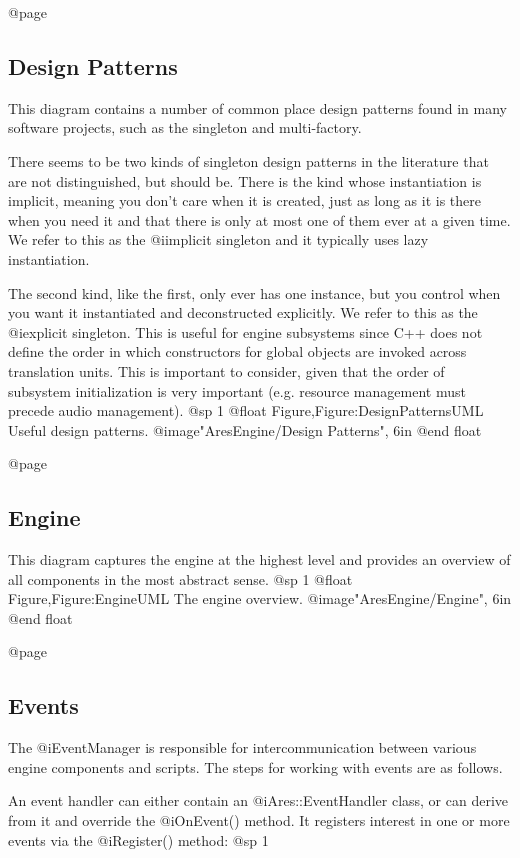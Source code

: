 @page
\subsection{Design Patterns}
This diagram contains a number of common place design patterns found in many software projects, such as the singleton and multi-factory. 

There seems to be two kinds of singleton design patterns in the literature that are not distinguished, but should be. There is the kind whose instantiation is implicit, meaning you don't care when it is created, just as long as it is there when you need it and that there is only at most one of them ever at a given time. We refer to this as the @i{implicit singleton} and it typically uses lazy instantiation.

The second kind, like the first, only ever has one instance, but you control when you want it instantiated and deconstructed explicitly. We refer to this as the @i{explicit singleton}. This is useful for engine subsystems since C++ does not define the order in which constructors for global objects are invoked across translation units. This is important to consider, given that the order of subsystem initialization is very important (e.g. resource management must precede audio management).
@sp 1
@float Figure,Figure:DesignPatternsUML
Useful design patterns.
@image{"AresEngine/Design Patterns", 6in}
@end float

@page
\subsection{Engine}
This diagram captures the engine at the highest level and provides an overview of all components in the most abstract sense.
@sp 1
@float Figure,Figure:EngineUML
The engine overview.
@image{"AresEngine/Engine", 6in}
@end float

@page 
\subsection{Events}
The @i{EventManager} is responsible for intercommunication between various engine components and scripts. The steps for working with events are as follows.

An event handler can either contain an @i{Ares::EventHandler} class, or can derive from it and override the @i{OnEvent()} method. It registers interest in one or more events via the @i{Register()} method:
@sp 1

